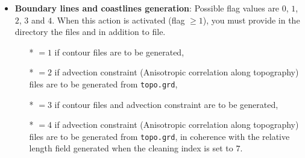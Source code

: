 \begin{itemize}

{\bf Note:} the files without any depth axis are treated separately by . The minimum and maximum
instrument depth (metadata) are used to recreate an artificial depth axis which can be used by diva. Please note that, in this case,
each file without depth axis (in datasource) should contain only one location (otherwise, the other ones are not used). 
This script also handles the current direction (CurrDir [deg T]) and speed (CurrSpd [cm/s]) and transforms them
into x-y components (North, East). In this second case, depth axis has to be present. In any case, 
can only deal with a maximum of 2 scalar variables (+ current direction and speed). If you need to analyse more than 2 scalar 
variables, you can proceed by steps (just changing the ).

\item {\bf Boundary lines and coastlines generation}: Possible flag values are $0$, $1$, $2$, $3$ and $4$. When this action is activated (flag $\geq 1$), you must provide in the  directory the files  and   in addition to  file.
              \begin{itemize}
                \item[*] $=1$ if contour files are to be generated,
                \item[*] $=2$ if advection constraint (Anisotropic correlation along topography) files are to be generated from  \texttt{topo.grd},
                \item[*] $=3$ if contour files and advection constraint are to be generated,
		\item[*] $=4$ if advection constraint (Anisotropic correlation along topography) files are to be generated from  \texttt{topo.grd}, in coherence with the relative length field generated when the cleaning index is set to $7$.
              \end{itemize}


\end{itemize}
